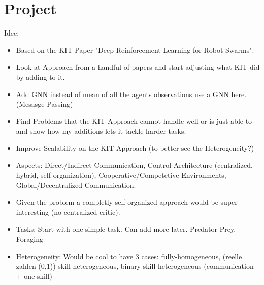 
\chapter{Project}
\label{ch:Project}

Idee:
\begin{itemize}[noitemsep,nolistsep]
    \item Based on the KIT Paper "Deep Reinforcement Learning for Robot Swarms".
    \item Look at Approach from a handful of papers and start adjusting what KIT did by adding to it.
    \item Add GNN instead of mean of all the agents observations use a GNN here. (Mesasge Passing)
    \item Find Problems that the KIT-Approach cannot handle well or is just able to and show how my additions lets it tackle harder tasks.
    \item Improve Scalability on the KIT-Approach (to better see the Heterogeneity?)
    \item Aspects: Direct/Indirect Communication, Control-Architecture (centralized, hybrid, self-organization), Cooperative/Competetive Environments, Global/Decentralized Communication.
    \item Given the problem a completly self-organized approach would be super interesting (no centralized critic).
    \item Tasks: Start with one simple task. Can add more later. Predator-Prey, Foraging
    \item Heterogeneity: Would be cool to have 3 cases: fully-homogeneous, (reelle zahlen (0,1))-skill-heterogeneous, binary-skill-heterogeneous (communication + one skill)
\end{itemize} 